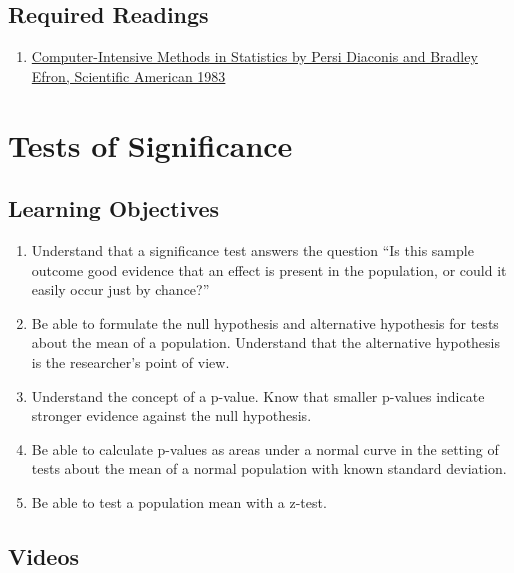\documentclass[letterpaper,9pt,twocolumn,twoside,printwatermark=false]{pinp}
\providecommand{\tightlist}{%
  \setlength{\itemsep}{0pt}\setlength{\parskip}{0pt}}
\begin{document}
\subsection{Required Readings}\label{required-readings}

\begin{enumerate}
\item \href{https://www.dropbox.com/s/cxiq70zxxtyxlb5/EfronDiaconisBootstrap.pdf?dl=0}{Computer-Intensive Methods in Statistics by Persi Diaconis and Bradley Efron, Scientific American 1983}
\end{enumerate}

\vspace*{0.25cm}

\section{Tests of Significance}\label{tests-of-significance}

\subsection{Learning Objectives}\label{learning-objectives-1}

\begin{enumerate}
\def\labelenumi{\arabic{enumi}.}
\tightlist
\item
  Understand that a significance test answers the question ``Is this
  sample outcome good evidence that an effect is present in the
  population, or could it easily occur just by chance?''
\item
  Be able to formulate the null hypothesis and alternative hypothesis
  for tests about the mean of a population. Understand that the
  alternative hypothesis is the researcher's point of view.
\item
  Understand the concept of a p-value. Know that smaller p-values
  indicate stronger evidence against the null hypothesis.
\item
  Be able to calculate p-values as areas under a normal curve in the
  setting of tests about the mean of a normal population with known
  standard deviation.
\item
  Be able to test a population mean with a z-test.
\end{enumerate}

\subsection{Videos}\label{videos}
\end{document}
